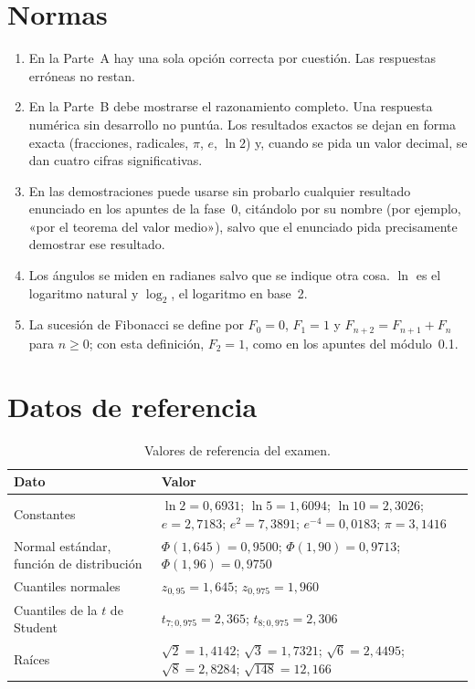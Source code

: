 \section*{Normas}
\begin{enumerate}[label=\arabic*.]
  \item En la Parte~A hay una sola opción correcta por cuestión. Las respuestas erróneas no restan.
  \item En la Parte~B debe mostrarse el razonamiento completo. Una respuesta numérica sin desarrollo no puntúa. Los resultados exactos se dejan en forma exacta (fracciones, radicales, $\pi$, $e$, $\ln 2$) y, cuando se pida un valor decimal, se dan cuatro cifras significativas.
  \item En las demostraciones puede usarse sin probarlo cualquier resultado enunciado en los apuntes de la fase~0, citándolo por su nombre (por ejemplo, «por el teorema del valor medio»), salvo que el enunciado pida precisamente demostrar ese resultado.
  \item Los ángulos se miden en radianes salvo que se indique otra cosa. $\ln$ es el logaritmo natural y $\log_2$, el logaritmo en base~2.
  \item La sucesión de Fibonacci se define por $F_0=0$, $F_1=1$ y $F_{n+2}=F_{n+1}+F_n$ para $n\ge0$; con esta definición, $F_2=1$, como en los apuntes del módulo~0.1.
\end{enumerate}

\section*{Datos de referencia}
\begin{table}[h]
\centering\small
\caption{Valores de referencia del examen.}\label{tab:datos}
\begin{tabularx}{\textwidth}{@{}lX@{}}
\toprule
Dato & Valor \\
\midrule
Constantes & $\ln 2=0{,}6931$; $\ln 5=1{,}6094$; $\ln 10=2{,}3026$; $e=2{,}7183$; $e^{2}=7{,}3891$; $e^{-4}=0{,}0183$; $\pi=3{,}1416$ \\
Normal estándar, función de distribución & $\Phi(1{,}645)=0{,}9500$; $\Phi(1{,}90)=0{,}9713$; $\Phi(1{,}96)=0{,}9750$ \\
Cuantiles normales & $z_{0{,}95}=1{,}645$; $z_{0{,}975}=1{,}960$ \\
Cuantiles de la $t$ de Student & $t_{7;0{,}975}=2{,}365$; $t_{8;0{,}975}=2{,}306$ \\
Raíces & $\sqrt2=1{,}4142$; $\sqrt3=1{,}7321$; $\sqrt6=2{,}4495$; $\sqrt8=2{,}8284$; $\sqrt{148}=12{,}166$ \\
\bottomrule
\end{tabularx}
\end{table}
